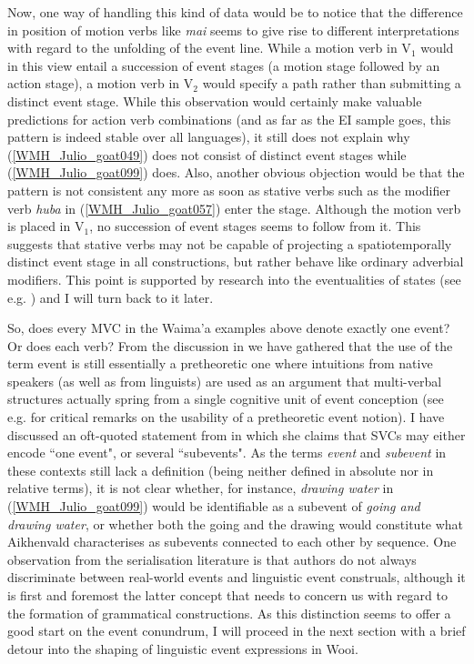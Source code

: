 Now, one way of handling this kind of data would be to notice that the difference in position of motion verbs like \textit{mai} seems to give rise to different interpretations with regard to the unfolding of the event line. While a motion verb in V$_1$ would in this view entail a succession of event stages (a motion stage followed by an action stage), a motion verb in V$_2$ would specify a path rather than submitting a distinct event stage. While this observation would certainly make valuable predictions for action verb combinations (and as far as the EI sample goes, this pattern is indeed stable over all languages), it still does not explain why (\ref{WMH_Julio_goat049}) does not consist of distinct event stages while (\ref{WMH_Julio_goat099}) does. Also, another obvious objection would be that the pattern is not consistent any more as soon as stative verbs such as the modifier verb \textit{huba} in (\ref{WMH_Julio_goat057}) enter the stage. Although the motion verb is placed in V$_1$, no succession of event stages seems to follow from it. This suggests that stative verbs may not be capable of projecting a spatiotemporally distinct event stage in all constructions, but rather behave like ordinary adverbial modifiers. This point is supported by research into the eventualities of states (see e.g. \citealt{maienborn2005limits}) and I will turn back to it later.

So, does every MVC in the Waima'a examples above denote exactly one event? Or does each verb? From the discussion in  we have gathered that the use of the term event is still essentially a pretheoretic one where intuitions from native speakers (as well as from linguists) are used as an argument that multi-verbal structures actually spring from a single cognitive unit of event conception (see e.g. \citealt{haspelmath2016serial} for critical remarks on the usability of a pretheoretic event notion). I have discussed an oft-quoted statement from \citet{Aikhenvald2006} in which she claims that SVCs may either encode ``one event", or several ``subevents". As the terms \textit{event} and \textit{subevent} in these contexts still lack a definition (being neither defined in absolute nor in relative terms), it is not clear whether, for instance, \textit{drawing water} in (\ref{WMH_Julio_goat099}) would be identifiable as a subevent of \textit{going and drawing water}, or whether both the going and the drawing would constitute what Aikhenvald characterises as subevents connected to each other by sequence. One observation from the serialisation literature is that authors do not always discriminate between real-world events and linguistic event construals, although it is first and foremost the latter concept that needs to concern us with regard to the formation of grammatical constructions. As this distinction seems to offer a good start on the event conundrum, I will proceed in the next section with a brief detour into the shaping of linguistic event expressions in Wooi.

